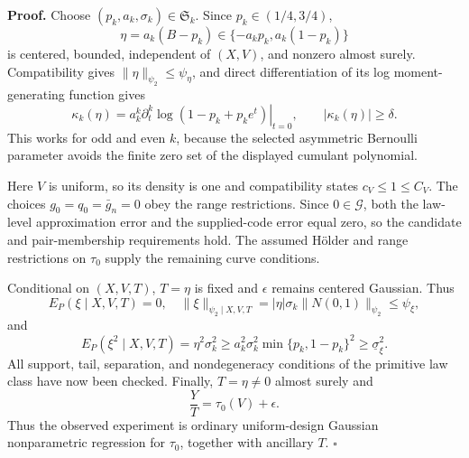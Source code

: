 \textbf{Proof.}
Choose \((p_k,a_k,\sigma_k)\in\mathfrak S_k\).  Since \(p_k\in(1/4,3/4)\),
\[
 \eta=a_k(B-p_k)\in\{-a_kp_k,a_k(1-p_k)\}
\]
is centered, bounded, independent of \((X,V)\), and nonzero almost surely.  Compatibility gives \(\|\eta\|_{\psi_2}\le\psi_\eta\), and direct differentiation of its log moment-generating function gives
\[
 \kappa_k(\eta)=a_k^k\left.\partial_t^k\log(1-p_k+p_ke^t)\right|_{t=0},
 \qquad |\kappa_k(\eta)|\ge\delta. \tag{1}
\]
This works for odd and even \(k\), because the selected asymmetric Bernoulli parameter avoids the finite zero set of the displayed cumulant polynomial.

Here \(V\) is uniform, so its density is one and compatibility states \(c_V\le1\le C_V\).  The choices \(g_0=q_0=\bar g_n=0\) obey the range restrictions.  Since \(0\in\mathcal G\), both the law-level approximation error and the supplied-code error equal zero, so the candidate and pair-membership requirements hold.  The assumed H\"older and range restrictions on \(\tau_0\) supply the remaining curve conditions.

Conditional on \((X,V,T)\), \(T=\eta\) is fixed and \(\epsilon\) remains centered Gaussian.  Thus
\[
 E_P(\xi\mid X,V,T)=0,
 \quad
 \|\xi\|_{\psi_2\mid X,V,T}
 =|\eta|\sigma_k\|N(0,1)\|_{\psi_2}
 \le\psi_\xi, \tag{2}
\]
and
\[
 E_P(\xi^2\mid X,V,T)=\eta^2\sigma_k^2
 \ge a_k^2\sigma_k^2\min\{p_k,1-p_k\}^2
 \ge\underline\sigma_\xi^2. \tag{3}
\]
All support, tail, separation, and nondegeneracy conditions of the primitive law class have now been checked.  Finally, \(T=\eta\ne0\) almost surely and
\[
 \frac{Y}{T}=\tau_0(V)+\epsilon. \tag{4}
\]
Thus the observed experiment is ordinary uniform-design Gaussian nonparametric regression for \(\tau_0\), together with ancillary \(T\). \(\square\)